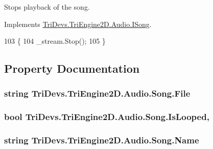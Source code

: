 Stops playback of the song. 



Implements \hyperlink{interface_tri_devs_1_1_tri_engine2_d_1_1_audio_1_1_i_song_a1777ba55d024dc7ba7288689d7eaa7de}{Tri\-Devs.\-Tri\-Engine2\-D.\-Audio.\-I\-Song}.


\begin{DoxyCode}
103         \{
104             \_stream.Stop();
105         \}
\end{DoxyCode}


\subsection{Property Documentation}
\hypertarget{class_tri_devs_1_1_tri_engine2_d_1_1_audio_1_1_song_ad91b8000e8c5cba9966c7bccb45f757e}{
\subsubsection[{File}]{\setlength{\rightskip}{0pt plus 5cm}string Tri\-Devs.\-Tri\-Engine2\-D.\-Audio.\-Song.\-File\hspace{0.3cm}{\ttfamily [get]}}}\label{class_tri_devs_1_1_tri_engine2_d_1_1_audio_1_1_song_ad91b8000e8c5cba9966c7bccb45f757e}
\hypertarget{class_tri_devs_1_1_tri_engine2_d_1_1_audio_1_1_song_a14ef6a7c19c61a1dbe7a7accd0ad2e4a}{
\subsubsection[{Is\-Looped}]{\setlength{\rightskip}{0pt plus 5cm}bool Tri\-Devs.\-Tri\-Engine2\-D.\-Audio.\-Song.\-Is\-Looped\hspace{0.3cm}{\ttfamily [get]}, {\ttfamily [set]}}}\label{class_tri_devs_1_1_tri_engine2_d_1_1_audio_1_1_song_a14ef6a7c19c61a1dbe7a7accd0ad2e4a}
\hypertarget{class_tri_devs_1_1_tri_engine2_d_1_1_audio_1_1_song_a250432e270435b4a7db08d81de5bd1cf}{
\subsubsection[{Name}]{\setlength{\rightskip}{0pt plus 5cm}string Tri\-Devs.\-Tri\-Engine2\-D.\-Audio.\-Song.\-Name\hspace{0.3cm}{\ttfamily [get]}}}\label{class_tri_devs_1_1_tri_engine2_d_1_1_audio_1_1_song_a250432e270435b4a7db08d81de5bd1cf}
